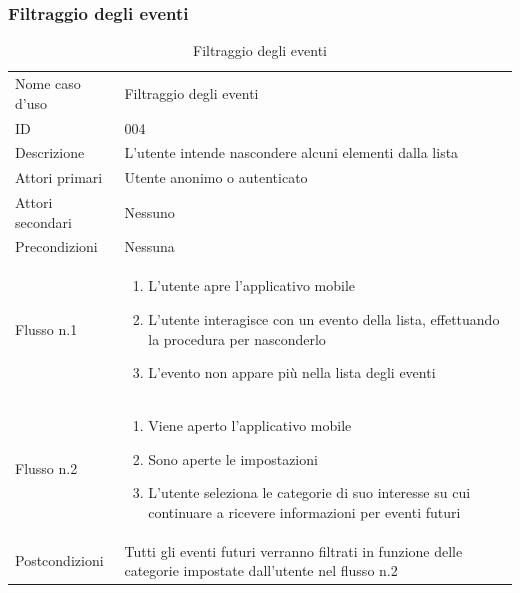 \documentclass{article}
\begin{document}
\clearpage

\subsubsection{Filtraggio degli eventi}

\begin{table}[htbp]
    \label{8.2.3}
    \centering
    \begin{tabularx}{\textwidth}{| l | X |}
        \Xhline{2pt} %
        Nome caso d'uso & Filtraggio degli eventi \\
        \Xhline{2pt} %
        ID & 004 \\
        \hline
        Descrizione & L'utente intende nascondere alcuni elementi dalla lista\\
        \hline
        Attori primari & Utente anonimo o autenticato\\
        \hline
        Attori secondari & Nessuno \\
        \hline
        Precondizioni & Nessuna \\
        \hline
        Flusso n.1 &
        \begin{enumerate}[topsep=5pt,partopsep=0pt,parsep=0pt,itemsep=0pt,before=\vspace{-\baselineskip},after=\vspace{-\baselineskip}]                
            \item L'utente apre l'applicativo mobile
            \item L'utente interagisce con un evento della lista, effettuando la procedura per nasconderlo
            \item L'evento non appare più nella lista degli eventi
        \end{enumerate}
        \\
        \hline
        Flusso n.2 &
        \begin{enumerate}[topsep=5pt,partopsep=0pt,parsep=0pt,itemsep=0pt,before=\vspace{-\baselineskip},after=\vspace{-\baselineskip}]                
            \item Viene aperto l'applicativo mobile
            \item Sono aperte le impostazioni
            \item L'utente seleziona le categorie di suo interesse su cui continuare a ricevere informazioni per eventi futuri
        \end{enumerate}
        \\
        \hline
        Postcondizioni & Tutti gli eventi futuri verranno filtrati in funzione delle categorie impostate dall'utente nel flusso n.2\\
        \hline
    \end{tabularx}
    \caption{Filtraggio degli eventi}
\end{table}
\end{document}
